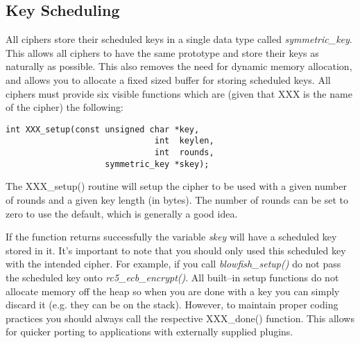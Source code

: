 \documentclass[synpaper]{book}
\begin{document}
\subsection{Key Scheduling}
All ciphers store their scheduled keys in a single data type called \textit{symmetric\_key}.  This allows all ciphers to 
have the same prototype and store their keys as naturally as possible.  This also removes the need for dynamic memory
allocation, and allows you to allocate a fixed sized buffer for storing scheduled keys.  All ciphers must provide six visible 
functions which are (given that XXX is the name of the cipher) the following:
\begin{verbatim}
int XXX_setup(const unsigned char *key, 
                              int  keylen, 
                              int  rounds,
                    symmetric_key *skey);
\end{verbatim}

The XXX\_setup() routine will setup the cipher to be used with a given number of rounds and a given key length (in bytes).
The number of rounds can be set to zero to use the default, which is generally a good idea.

If the function returns successfully the variable \textit{skey} will have a scheduled key stored in it.  It's important to note
that you should only used this scheduled key with the intended cipher.  For example, if you call \textit{blowfish\_setup()} do not 
pass the scheduled key onto \textit{rc5\_ecb\_encrypt()}.  All built--in setup functions do not allocate memory off the heap so 
when you are done with a key you can simply discard it (e.g. they can be on the stack).  However, to maintain proper coding
practices you should always call the respective XXX\_done() function.  This allows for quicker porting to applications with
externally supplied plugins.
\end{document}
